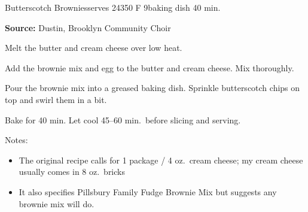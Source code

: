 \begin{recipe}{Butterscotch Brownies}{serves 24}{350\0 F \hfill 9\inch{}\inch baking dish \hfill 40 min.}

 \freeform \textbf{Source:} Dustin, Brooklyn Community Choir

 Melt the butter and cream cheese over low heat.

 Add the brownie mix and egg to the butter and cream cheese. Mix thoroughly.

 Pour the brownie mix into a greased baking dish. Sprinkle butterscotch chips on top and swirl them in a bit.

 \newstep Bake for 40 min. Let cool 45--60 min.\ before slicing and serving.

 \freeform Notes:
 \begin{itemize}
  \item The original recipe calls for 1 package / 4 oz.\ cream cheese; my cream cheese usually comes in 8 oz.\ bricks
  \item It also specifies Pillsbury Family Fudge Brownie Mix but suggests any brownie mix will do.
 \end{itemize}
\end{recipe}
